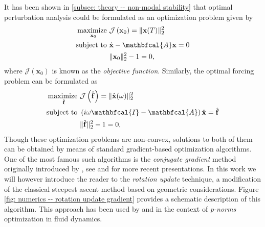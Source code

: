   It has been shown in \textsection \ref{subsec: theory -- non-modal stability} that optimal perturbation analysis could be formulated as an optimization problem given by
  \begin{equation}
      \begin{aligned}
        \maximize \limits_{\mathbf{x}_0} & \mathcal{J} \left( \mathbf{x}_0 \right) = \| \mathbf{x}(T) \|_2^2\\
        \subjecto & \dot{\mathbf{x}} - \mathbfcal{A}\mathbf{x} = 0 \\
        ~ & \| \mathbf{x}_0 \|_2^2 - 1 = 0,
      \end{aligned}
      \label{eq: numerics -- optimal perturbation constrained maximization}
  \end{equation}
  where $\mathcal{J}(\mathbf{x}_{0})$ is known as the \emph{objective function}. Similarly, the optimal forcing problem can be formulated as
  \begin{equation}
      \begin{aligned}
        \maximize \limits_{\hat{\mathbf{f}}} & \mathcal{J} \left(    \hat{\mathbf{f}} \right) = \| \hat{\mathbf{x}}(\omega) \|_2^2\\
        \subjecto & \left( i \omega \mathbfcal{I} - \mathbfcal{A} \right) \hat{\mathbf{x}} = \hat{\mathbf{f}} \\
        ~ & \| \hat{\mathbf{f}} \|_2^2 - 1 = 0,
      \end{aligned}
      \label{eq: numerics -- optimal forcing constrained maximization}
  \end{equation}
  Though these optimization problems are non-convex, solutions to both of them can be obtained by means of standard gradient-based optimization algorithms. One of the most famous such algorithms is the \emph{conjugate gradient} method originally introduced by \cite{book:hestenes:1952}, see \cite{book:saad:2003} and \cite{book:golub:2012} for more recent presentations. In this work we will however introduce the reader to the \emph{rotation update} technique, a modification of the classical steepest ascent method based on geometric considerations. Figure \ref{fig: numerics -- rotation update gradient} provides a schematic description of this algorithm. This approach has been used by \cite{jfm:foures:2013, jfm:foures:2014} and \cite{fdr:farano:2016} in the context of \emph{p-norms} optimization in fluid dynamics.

